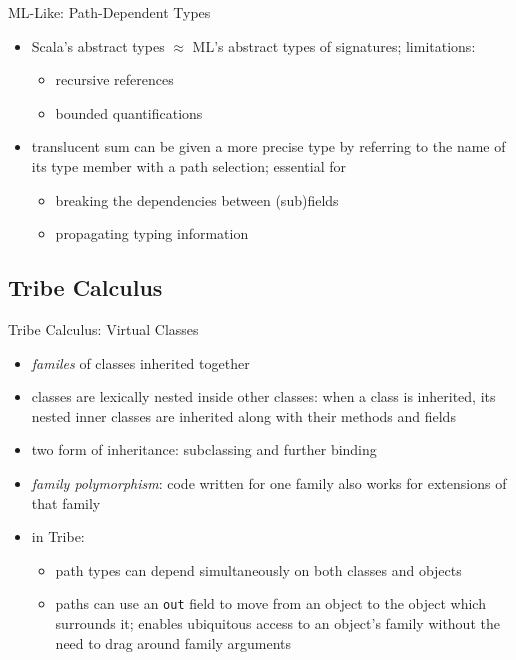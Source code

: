 \documentclass{beamer}
\begin{document}

\begin{frame}{ML-Like: Path-Dependent Types}
\begin{itemize}
\item Scala's abstract types  $\approx$ ML's abstract types of signatures; limitations:
\begin{itemize}
\item recursive references
\item bounded quantifications
\end{itemize}
\item translucent sum can be given a more precise type by referring to the name of its type member with a path selection; essential for %
\begin{itemize}
\item breaking the dependencies between (sub)fields
\item propagating typing information
\end{itemize}
\end{itemize}
\end{frame}

\subsection{Tribe Calculus}

\begin{frame}{Tribe Calculus: Virtual Classes}
\begin{itemize}
\item {\it familes} of classes inherited together
\item classes are lexically nested inside other classes: when a class
  is inherited, its nested inner classes are inherited along with
  their methods and fields
\item two form of inheritance: subclassing and further binding
\item {\it family polymorphism}: code written for one family
  also works for extensions of that family
\item in Tribe:\begin{itemize}
\item path types can depend simultaneously on both classes and objects
\item paths can use an {\tt out} field to move from an object to the
  object which surrounds it; enables ubiquitous access to an object's
  family without the need to drag around family arguments
\end{itemize}
\end{itemize}
\end{frame}
\end{document}
